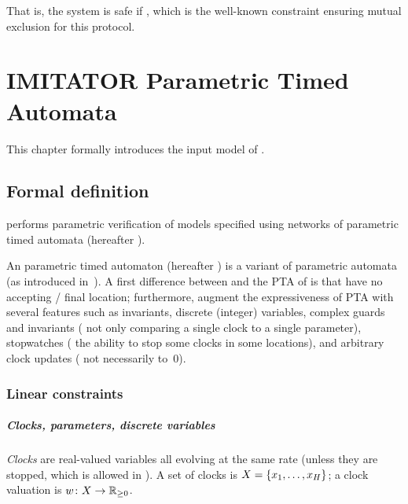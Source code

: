 That is, the system is safe if , which is the well-known constraint ensuring mutual exclusion for this protocol.




\chapter{IMITATOR Parametric Timed Automata}\label{section:IPTA}


This chapter formally introduces the input model of \imitator{}.

\section{Formal definition}\label{section:NIPTA}

\imitator{} performs parametric verification of models specified using networks of \imitator{} parametric timed automata (hereafter \NIPTA{}).

An \imitator{} parametric timed automaton (hereafter \IPTA{}) is a variant of parametric automata (as introduced in~\cite{AHV93}).
A first difference between \IPTA{} and the PTA of \cite{AHV93} is that \IPTA{} have no accepting / final location;
furthermore, \IPTA{} augment the expressiveness of PTA with several features such as invariants, discrete (integer) variables, complex guards and invariants (\ie{} not only comparing a single clock to a single parameter), stopwatches (\ie{} the ability to stop some clocks in some locations), and arbitrary clock updates (\ie{} not necessarily to~0).


\subsection{Linear constraints}


\paragraph{Clocks, parameters, discrete variables}
\emph{Clocks} are real-valued variables all evolving at the same rate (unless they are stopped, which is allowed in \imitator{}).
A set of clocks is $X = \{ x_1, \dots, x_H \}$;
a clock valuation is
$w \colon X \rightarrow {\mathbb R}_{\geq 0}$.

